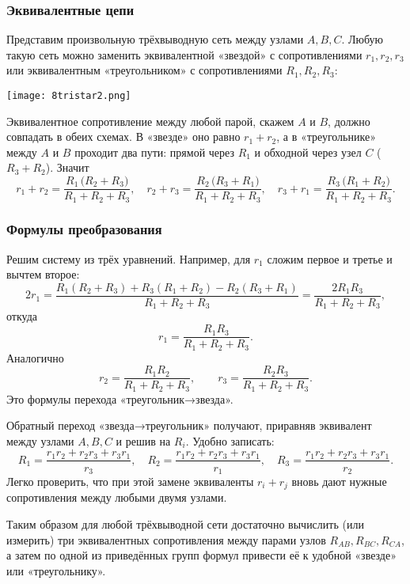\documentclass[12pt, a4paper]{article}%
\begin{document}
\subsubsection*{Эквивалентные цепи}

Представим произвольную трёхвыводную сеть между узлами $A,B,C$. Любую такую сеть можно заменить эквивалентной «звездой» 
с сопротивлениями $r_1,r_2,r_3$ или эквивалентным «треугольником» с сопротивлениями $R_1,R_2,R_3$:

\begin{center}
\texttt{[image: 8tristar2.png]}
\label{fig:mpr}
\end{center}

Эквивалентное сопротивление между любой парой, скажем $A$ и $B$, должно совпадать в обеих схемах. В «звезде» оно равно $r_1+r_2$, а в «треугольнике» между $A$ и $B$ проходит два пути: прямой через $R_1$ и обходной через узел $C$ ($R_3+R_2$). Значит
\[
r_1 + r_2 = \frac{R_1\,\bigl(R_2 + R_3\bigr)}{R_1 + R_2 + R_3},
\quad
r_2 + r_3 = \frac{R_2\,\bigl(R_3 + R_1\bigr)}{R_1 + R_2 + R_3},
\quad
r_3 + r_1 = \frac{R_3\,\bigl(R_1 + R_2\bigr)}{R_1 + R_2 + R_3}.
\]

\subsubsection*{Формулы преобразования}
Решим систему из трёх уравнений. Например, для $r_1$ сложим первое и третье и вычтем второе:
\[
2r_1 = \frac{R_1(R_2+R_3) + R_3(R_1+R_2) - R_2(R_3+R_1)}{R_1+R_2+R_3}
= \frac{2R_1R_3}{R_1+R_2+R_3},
\]
откуда
\[
r_1 = \frac{R_1R_3}{R_1 + R_2 + R_3}.
\]
Аналогично
\[
r_2 = \frac{R_1R_2}{R_1 + R_2 + R_3},
\qquad
r_3 = \frac{R_2R_3}{R_1 + R_2 + R_3}.
\]
Это формулы перехода «треугольник→звезда».

Обратный переход «звезда→треугольник» получают, приравняв эквивалент между узлами $A,B,C$ и решив на $R_i$. Удобно записать:
\[
R_1 = \frac{r_1r_2 + r_2r_3 + r_3r_1}{r_3},
\quad
R_2 = \frac{r_1r_2 + r_2r_3 + r_3r_1}{r_1},
\quad
R_3 = \frac{r_1r_2 + r_2r_3 + r_3r_1}{r_2}.
\]
Легко проверить, что при этой замене эквиваленты $r_i+r_j$ вновь дают нужные сопротивления между любыми двумя узлами.

Таким образом для любой трёхвыводной сети достаточно вычислить (или измерить) три эквивалентных сопротивления между парами 
узлов $R_{AB},R_{BC},R_{CA}$, а затем по одной из приведённых групп формул привести её к удобной «звезде» или «треугольнику».
\end{document}
